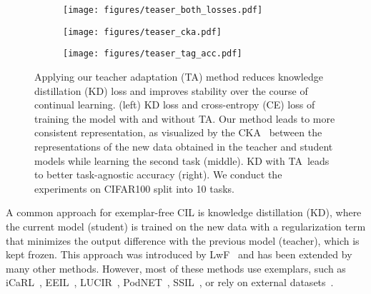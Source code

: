 \documentclass[10pt,twocolumn,letterpaper]{article}
\newcommand\marcin[1]{{\color{red} \bf Marcin: #1}}
\newcommand\ta{TA}
\begin{document}


\begin{figure*}[t]
    \centering
      \begin{subfigure}[b]{0.33\textwidth}
        \centering
        \texttt{[image: figures/teaser\_both\_losses.pdf]}
          \end{subfigure}
    \begin{subfigure}[b]{0.33\textwidth}
        \centering
        \texttt{[image: figures/teaser\_cka.pdf]}
    \end{subfigure}
    \begin{subfigure}[b]{0.33\textwidth}
        \centering
        \texttt{[image: figures/teaser\_tag\_acc.pdf]}
    \end{subfigure}

   \caption{
   Applying our teacher adaptation (TA) method reduces knowledge distillation (KD) loss and improves stability over the course of continual learning. 
 (left) KD loss and cross-entropy (CE) loss of training the model with and without TA. Our method leads to more consistent representation, as visualized by the CKA~\cite{kornblith2019similarity} between the representations of the new data obtained in the teacher and student models while learning the second task (middle). KD with \ta\ leads to better task-agnostic accuracy (right). We conduct the experiments on CIFAR100 split into 10 tasks.
 }
   \label{fig:teaser}
\end{figure*}


A common approach for exemplar-free CIL is knowledge distillation (KD), where the current model (student) is trained on the new data with a regularization term that minimizes the output difference with the previous model (teacher), which is kept frozen. This approach was introduced by LwF~\cite{li2017learning} and has been extended by many other methods. However, most of these methods use exemplars, such as iCaRL~\cite{rebuffi2017icarl}, EEIL~\cite{castro2018end}, LUCIR~\cite{hou2019learning}, PodNET~\cite{douillard2020podnet}, SSIL~\cite{ahn2021ss}, or rely on external datasets~\cite{dmc,lee2019overcoming}.
\end{document}
